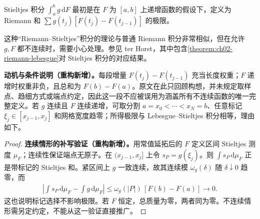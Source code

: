 \documentclass[../../main.tex]{subfiles}%
\begin{document}
\begin{definition}\label{definition:ch03-riemann-stieltjes-integral}
Stieltjes 积分 $\int_a^b g\,\mathrm dF$ 最初是在 $F$ 为 $[a,b]$ 上递增函数的假设下，定义为 Riemann 和 $\sum g(t_j)[F(t_j)-F(t_{j-1})]$ 的极限。
\end{definition}
这种“Riemann–Stieltjes”积分的理论与普通 Riemann 积分非常相似，但在允许 $g,F$ 都不连续时，需要小心处理。参见 ter Horst\cite{folland-bib-148}，其中包含\cref{theorem:ch02-riemann-lebesgue}对 Stieltjes 积分的对应结果。
\begin{remark}
\textbf{动机与条件说明（重构新增）。}每段增量 $F(t_j)-F(t_{j-1})$ 充当长度权重；$F$ 递增时权重非负，且总和为 $F(b)-F(a)$。原文在此只回顾构想，并未规定取样点、趋细方式或端点约定，因此这一段不应被误用为涵盖所有不连续函数的唯一完整定义。若 $g$ 连续且 $F$ 连续递增，可取分割 $a=x_0<\cdots<x_N=b$、任意标记 $\xi_j\in[x_{j-1},x_j]$ 和网格宽度趋零；所得极限与 Lebesgue–Stieltjes 积分相等，理由如下。
\end{remark}
\begin{proof}
\textbf{连续情形的补写验证（重构新增）。}用常值延拓后的 $F$ 定义区间 Stieltjes 测度 $\mu_F$；连续性保证端点无原子。在 $(x_{j-1},x_j]$ 上令 $s_P=g(\xi_j)$。则 $\int s_P\,\mathrm d\mu_F$ 正是带标记的 Stieltjes 和。紧区间上 $g$ 一致连续，故其连续模 $\omega_g(\delta)$ 随 $\delta\downarrow0$ 趋零，而
\begin{align*}
\left|\int s_P\,\mathrm d\mu_F-\int g\,\mathrm d\mu_F\right|
\le\omega_g(|P|)\,[F(b)-F(a)]\longrightarrow0.
\end{align*}
这也说明标记选择不影响极限。若 $F$ 恒定，总质量为零，两者同为零。不连续情形需另定约定，不能从这一验证直接推广。
\end{proof}
\end{document}

